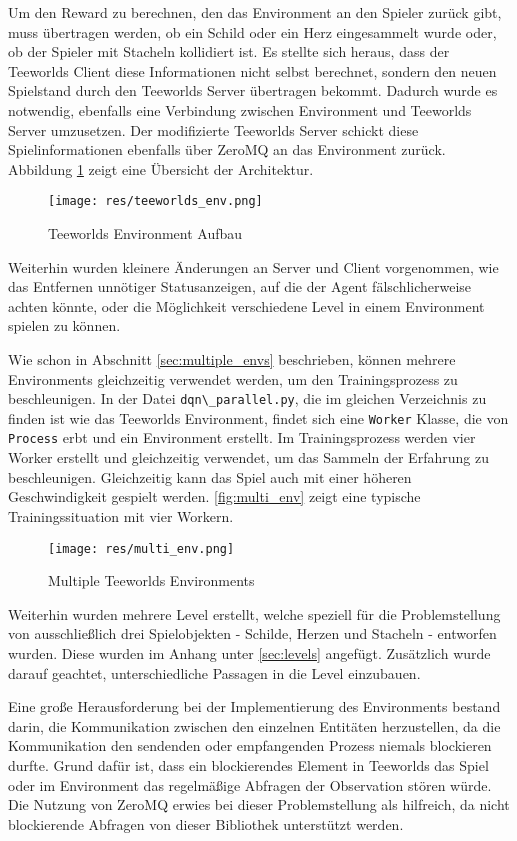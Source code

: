 \documentclass[11pt]{scrartcl}
\begin{document}
\noindent
Um den Reward zu berechnen, den das Environment an den Spieler zurück gibt, muss
übertragen werden, ob ein Schild oder ein Herz eingesammelt wurde oder, ob der Spieler mit
Stacheln kollidiert ist. Es stellte sich heraus, dass der Teeworlds Client diese Informationen
nicht selbst berechnet, sondern den neuen Spielstand durch den Teeworlds Server übertragen bekommt.
Dadurch wurde es notwendig, ebenfalls eine Verbindung zwischen Environment und Teeworlds Server
umzusetzen. Der modifizierte Teeworlds Server schickt diese Spielinformationen ebenfalls über
ZeroMQ an das Environment zurück. Abbildung \ref{fig:teeworlds_env} zeigt eine Übersicht der
Architektur.
\begin{figure}[htp]
  \centering
  \texttt{[image: res/teeworlds\_env.png]}
  \caption{Teeworlds Environment Aufbau}
  \label{fig:teeworlds_env}
\end{figure}
\noindent
Weiterhin wurden kleinere Änderungen an Server und Client vorgenommen, wie das Entfernen
unnötiger Statusanzeigen, auf die der Agent fälschlicherweise achten könnte, oder die
Möglichkeit verschiedene Level in einem Environment spielen zu können.

Wie schon in Abschnitt \ref{sec:multiple_envs} beschrieben, können mehrere Environments
gleichzeitig verwendet werden, um den Trainingsprozess zu beschleunigen. In der Datei
\lstinline!dqn\_parallel.py!, die im gleichen Verzeichnis zu finden ist wie das Teeworlds
Environment, findet sich eine \lstinline!Worker! Klasse, die von \lstinline!Process! erbt
und ein Environment erstellt. Im Trainingsprozess werden vier Worker erstellt und
gleichzeitig verwendet, um das Sammeln der Erfahrung zu beschleunigen. Gleichzeitig kann
das Spiel auch mit einer höheren Geschwindigkeit gespielt werden. \autoref{fig:multi_env}
zeigt eine typische Trainingssituation mit vier Workern.
\begin{figure}[htp]
  \centering
  \texttt{[image: res/multi\_env.png]}
  \caption{Multiple Teeworlds Environments}
  \label{fig:multi_env}
\end{figure}
\noindent

Weiterhin wurden mehrere Level erstellt, welche speziell für die Problemstellung von
ausschließlich drei Spielobjekten - Schilde, Herzen und Stacheln -  entworfen wurden.
Diese wurden im Anhang unter \autoref{sec:levels} angefügt. Zusätzlich wurde darauf
geachtet, unterschiedliche Passagen in die Level einzubauen.

Eine große Herausforderung bei der Implementierung des Environments bestand darin, die
Kommunikation zwischen den einzelnen Entitäten herzustellen, da die Kommunikation den
sendenden oder empfangenden Prozess niemals blockieren durfte. Grund dafür ist, dass
ein blockierendes Element in Teeworlds das Spiel oder im Environment das regelmäßige
Abfragen der Observation stören würde. Die Nutzung von ZeroMQ erwies bei dieser
Problemstellung als hilfreich, da nicht blockierende Abfragen von dieser Bibliothek
unterstützt werden.
\end{document}
